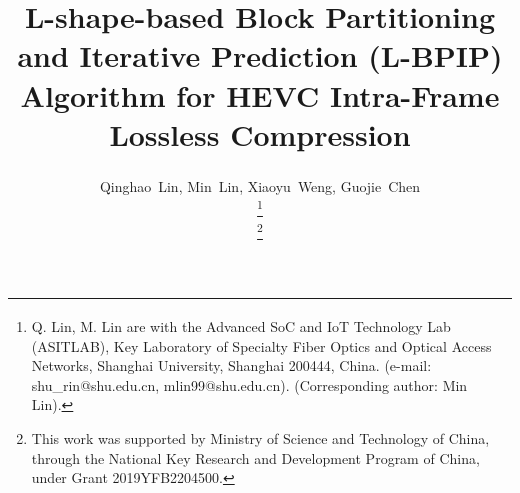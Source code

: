 \documentclass[journal]{IEEEtran}
\begin{document}
%
\title{L-shape-based Block Partitioning and Iterative Prediction (L-BPIP) Algorithm for HEVC Intra-Frame Lossless Compression}
%
%
%

\author{
    Qinghao~Lin, Min~Lin\textsuperscript{\Letter}, Xiaoyu~Weng, Guojie~Chen

    \thanks{Q. Lin, M. Lin\textsuperscript{\Letter} are with the Advanced SoC and IoT Technology Lab (ASITLAB), Key Laboratory of Specialty Fiber Optics and Optical Access Networks, Shanghai University, Shanghai 200444, China. (e-mail: shu\_rin@shu.edu.cn, mlin99@shu.edu.cn). (Corresponding author: Min Lin).}

    \thanks{This work was supported by Ministry of Science and Technology of China, through the National Key Research and Development Program of China, under Grant 2019YFB2204500.}
}


% 
%
\end{document}
